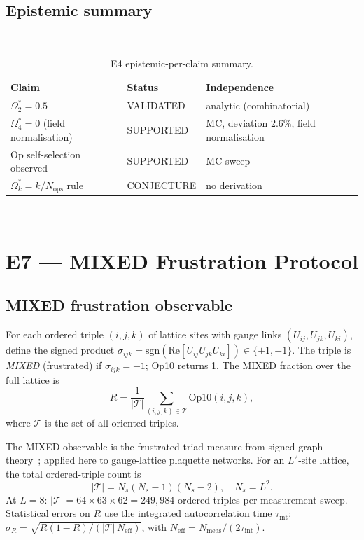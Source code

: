 \documentclass[12pt,a4paper]{article}
\theoremstyle{plain}
\theoremstyle{definition}
\theoremstyle{remark}
\begin{document}
\subsection{Epistemic summary}

\begin{table}[htbp]
\caption{E4 epistemic-per-claim summary.}
\label{tab:E4-epistemic}
\
\begin{tabular}{lll}
\toprule
Claim & Status & Independence \\
\midrule
$\Omega_2^*=0.5$ & VALIDATED & analytic (combinatorial) \\
$\Omega_4^*=0$ (field normalisation) & SUPPORTED & MC, deviation 2.6\%, field normalisation \\
Op self-selection observed & SUPPORTED & MC sweep \\
$\Omega_k^*=k/N_{\mathrm{ops}}$ rule & CONJECTURE & no derivation \\
\bottomrule
\end{tabular}
\
\end{table}

\section{E7 --- MIXED Frustration Protocol}
\label{sec:E7}

\subsection{MIXED frustration observable}

For each ordered triple $(i,j,k)$ of lattice sites with gauge links
$(U_{ij}, U_{jk}, U_{ki})$, define the signed product
$\sigma_{ijk} = \mathrm{sgn}(\mathrm{Re}[U_{ij}U_{jk}U_{ki}])\in\{+1,-1\}$.
The triple is \emph{MIXED} (frustrated) if $\sigma_{ijk}=-1$; Op10 returns 1.
The MIXED fraction over the full lattice is
\[
  R = \frac{1}{|\mathcal{T}|}\sum_{(i,j,k)\in\mathcal{T}}\mathrm{Op10}(i,j,k),
\]
where $\mathcal{T}$ is the set of all oriented triples.

The MIXED observable is the frustrated-triad measure from signed graph
theory~\cite{Harary1953,Cartwright1956,Facchetti2011}; applied here to
gauge-lattice plaquette networks.
For an $L^2$-site lattice, the total ordered-triple count is
\begin{equation}\label{eq:T-formula}
  |\mathcal{T}| = N_s(N_s-1)(N_s-2), \quad N_s = L^2.
\end{equation}
At $L=8$: $|\mathcal{T}| = 64\times 63\times 62 = 249{,}984$ ordered triples
per measurement sweep.
Statistical errors on $R$ use the integrated autocorrelation time
$\tau_{\mathrm{int}}$:
$\sigma_R = \sqrt{R(1-R)/(|\mathcal{T}|\,N_{\mathrm{eff}})}$,
with $N_{\mathrm{eff}} = N_{\mathrm{meas}}/(2\tau_{\mathrm{int}})$.
\end{document}

